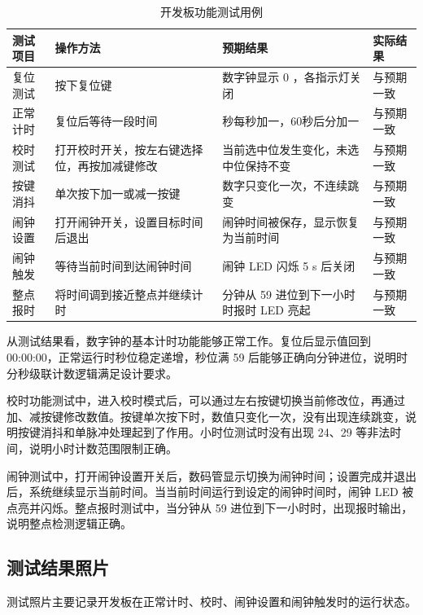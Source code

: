 \documentclass[12pt,a4paper,UTF8]{ctexart}
\begin{document}
\begin{table}[htbp]
    \centering
    \caption{开发板功能测试用例}
    \small
    \renewcommand{\arraystretch}{1.35}
    \begin{tabular}{C{0.14\textwidth}C{0.27\textwidth}C{0.31\textwidth}C{0.14\textwidth}}
        \toprule
        \textbf{测试项目} & \textbf{操作方法} & \textbf{预期结果} & \textbf{实际结果} \\
        \midrule
        复位测试 & 按下复位键 & 数字钟显示 0 ，各指示灯关闭& 与预期一致 \\
        正常计时 & 复位后等待一段时间 & 秒每秒加一，60秒后分加一 & 与预期一致 \\
        校时测试 & 打开校时开关，按左右键选择位，再按加减键修改 & 当前选中位发生变化，未选中位保持不变 & 与预期一致 \\
        按键消抖 & 单次按下加一或减一按键 & 数字只变化一次，不连续跳变 & 与预期一致 \\
        闹钟设置 & 打开闹钟开关，设置目标时间后退出 & 闹钟时间被保存，显示恢复为当前时间 & 与预期一致 \\
        闹钟触发 & 等待当前时间到达闹钟时间 & 闹钟 LED 闪烁 5 s 后关闭 & 与预期一致 \\
        整点报时 & 将时间调到接近整点并继续计时 & 分钟从 59 进位到下一小时时报时 LED 亮起 & 与预期一致 \\
        \bottomrule
    \end{tabular}
\end{table}

从测试结果看，数字钟的基本计时功能能够正常工作。复位后显示值回到 00:00:00，正常运行时秒位稳定递增，秒位满 59 后能够正确向分钟进位，说明时分秒级联计数逻辑满足设计要求。

校时功能测试中，进入校时模式后，可以通过左右按键切换当前修改位，再通过加、减按键修改数值。按键单次按下时，数值只变化一次，没有出现连续跳变，说明按键消抖和单脉冲处理起到了作用。小时位测试时没有出现 24、29 等非法时间，说明小时计数范围限制正确。

闹钟测试中，打开闹钟设置开关后，数码管显示切换为闹钟时间；设置完成并退出后，系统继续显示当前时间。当当前时间运行到设定的闹钟时间时，闹钟 LED 被点亮并闪烁。整点报时测试中，当分钟从 59 进位到下一小时时，出现报时输出，说明整点检测逻辑正确。

\subsection{测试结果照片}

测试照片主要记录开发板在正常计时、校时、闹钟设置和闹钟触发时的运行状态。
\end{document}
